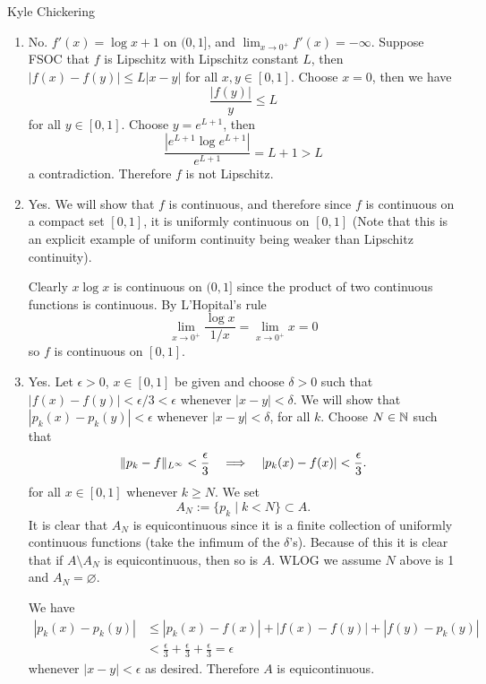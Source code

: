 \bigskip

\begin{solution}{Kyle Chickering}
	\begin{enumerate}[label=(\alph*)]
    \item
        No. 
        $f'(x)=\log x + 1$ on $(0,1]$, and $\lim_{x\rightarrow 0^+}f'(x) = -\infty$.
        Suppose FSOC that $f$ is Lipschitz with Lipschitz constant $L$, then $|f(x)-f(y)|\leqslant L|x-y|$ for all $x,y\in [0,1]$.
        Choose $x=0$, then we have
        \[ \frac{|f(y)|}{y} \leqslant L \]
        for all $y\in [0,1]$.
        Choose $y=e^{L+1}$, then
        \[ \frac{|e^{L+1}\log e^{L+1}|}{e^{L+1}}= L+1 > L \]
		a contradiction.
        Therefore $f$ is not Lipschitz.

	\item 
        Yes. 
        We will show that $f$ is continuous, and therefore since $f$ is continuous on a compact set $[0,1]$, it is uniformly continuous on $[0,1]$ (Note that this is an explicit example of uniform continuity being weaker than Lipschitz continuity).

		Clearly $x\log x$ is continuous on $(0,1]$ since the product of two continuous functions is continuous.
        By L'Hopital's rule
        \[ \lim_{x\rightarrow 0^+}\frac{\log x}{1/x} = \lim_{x\rightarrow 0^+}x = 0 \]
		so $f$ is continuous on $[0,1]$.

	\item 
        Yes. 
        Let $\epsilon>0$, $x\in [0,1]$ be given and choose $\delta>0$ such that $|f(x)-f(y)| < \epsilon/3 < \epsilon$ whenever $|x-y|<\delta$.
        We will show that $|p_k(x)-p_k(y)|<\epsilon$ whenever $|x-y|<\delta$, for all $k$.
        Choose $N\in \mathbb{N}$ such that
        \[ \lVert p_k-f\rVert_{L^\infty}<\frac{\epsilon}{3} \quad \Longrightarrow \quad |p_k(x)-f(x)| < \frac{\epsilon}{3}. \]
        for all $x\in [0,1]$ whenever $k \geqslant N$.
        We set
        \[ A_N:=\{p_k \mid k<N\} \subset A. \]
		It is clear that $A_N$ is equicontinuous since it is a finite collection of uniformly continuous functions (take the infimum of the $\delta$'s).
        Because of this it is clear that if $A\setminus A_N$ is equicontinuous, then so is $A$.
        WLOG we assume $N$ above is 1 and $A_N=\varnothing$.

		We have
		\begin{align*}
			|p_k(x)-p_k(y)| &\leqslant |p_k(x)-f(x)| + |f(x)-f(y)| + |f(y)-p_k(y)| \\
                            &< \frac{\epsilon}{3} + \frac{\epsilon}{3} + \frac{\epsilon}{3} = \epsilon
		\end{align*}
		whenever $|x-y|<\epsilon$ as desired. Therefore $A$ is equicontinuous.
	\end{enumerate}
\end{solution}

